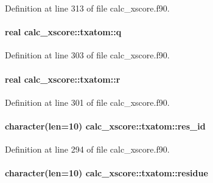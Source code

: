 Definition at line 313 of file calc\-\_\-xscore.\-f90.

\hypertarget{structcalc__xscore_1_1txatom_a5083f011441818307a67358328628c1c}{
\paragraph[{q}]{\setlength{\rightskip}{0pt plus 5cm}real calc\-\_\-xscore\-::txatom\-::q}}\label{structcalc__xscore_1_1txatom_a5083f011441818307a67358328628c1c}


Definition at line 303 of file calc\-\_\-xscore.\-f90.

\hypertarget{structcalc__xscore_1_1txatom_afabf69a10d10a0c4fe08fda0eb585efb}{
\paragraph[{r}]{\setlength{\rightskip}{0pt plus 5cm}real calc\-\_\-xscore\-::txatom\-::r}}\label{structcalc__xscore_1_1txatom_afabf69a10d10a0c4fe08fda0eb585efb}


Definition at line 301 of file calc\-\_\-xscore.\-f90.

\hypertarget{structcalc__xscore_1_1txatom_a28e970dac2532184db1dae189f8d2b6c}{
\paragraph[{res\-\_\-id}]{\setlength{\rightskip}{0pt plus 5cm}character(len=10) calc\-\_\-xscore\-::txatom\-::res\-\_\-id}}\label{structcalc__xscore_1_1txatom_a28e970dac2532184db1dae189f8d2b6c}


Definition at line 294 of file calc\-\_\-xscore.\-f90.

\hypertarget{structcalc__xscore_1_1txatom_a719ac81e8984161ca3fc13bd061edd38}{
\paragraph[{residue}]{\setlength{\rightskip}{0pt plus 5cm}character(len=10) calc\-\_\-xscore\-::txatom\-::residue}}\label{structcalc__xscore_1_1txatom_a719ac81e8984161ca3fc13bd061edd38}


